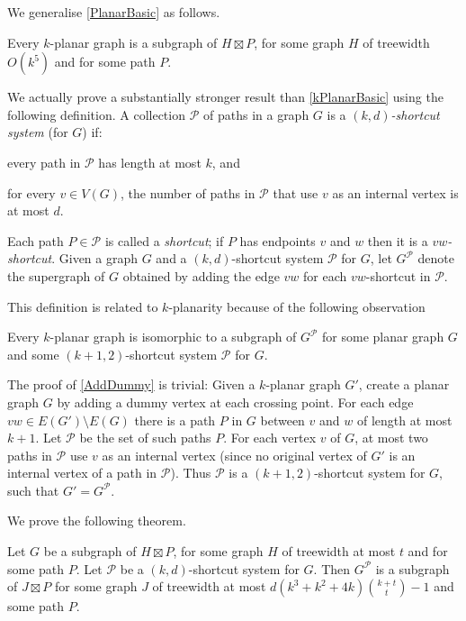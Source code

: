 \documentclass{patmorin}
\newcommand{\PP}{\mathcal{P}}
\begin{document}
We generalise \cref{PlanarBasic} as follows. 

\begin{thm}
\label{kPlanarBasic}
Every $k$-planar graph is a subgraph of $H\boxtimes P$, for some graph $H$ of treewidth $O(k^5)$ and for some path $P$. 
\end{thm}

We actually prove a substantially stronger result than \cref{kPlanarBasic} using the following definition. A collection $\mathcal{P}$ of paths in a graph $G$ is a \emph{$(k,d)$-shortcut system} (for $G$) if:
\begin{compactitem}
\item every path in $\mathcal{P}$ has length at most $k$, and
\item for every $v\in V(G)$, the number of paths in $\mathcal{P}$ that use $v$ as an internal vertex is at most $d$.
\end{compactitem} 
Each path $P\in\mathcal{P}$ is called a \emph{shortcut}; if $P$ has endpoints $v$ and $w$ then it is a \emph{$vw$-shortcut}. Given a graph $G$ and a $(k,d)$-shortcut system $\mathcal{P}$ for $G$, let $G^{\mathcal{P}}$ denote the supergraph of $G$ obtained by adding the edge $vw$ for each $vw$-shortcut in $\mathcal{P}$. 

This definition is related to $k$-planarity because of the following observation 

\begin{obs}
\label{AddDummy}
Every $k$-planar graph is isomorphic to a subgraph of $G^\PP$ for some planar graph $G$ and some $(k+1,2)$-shortcut system $\PP$ for $G$. 
\end{obs}

The proof of \cref{AddDummy} is trivial: Given a $k$-planar graph $G'$, create a planar graph $G$ by adding a dummy vertex at each crossing point. For each edge $vw\in E(G')\setminus E(G)$ there is a path $P$ in $G$ between $v$ and $w$ of length at most $k+1$. Let $\PP$ be the set of such paths $P$. For each vertex $v$ of $G$, at most two paths in $\PP$ use $v$ as an internal vertex (since no original vertex of $G'$ is an internal vertex of a path in $\PP$). Thus $\PP$ is a $(k+1,2)$-shortcut system for $G$, such that $G'=G^\PP$. 

We prove the following theorem.

\begin{thm}
\label{ShortcutProduct}
Let $G$ be a subgraph of $H\boxtimes P$, for some graph $H$ of treewidth at most $t$ and for some path $P$. 
Let $\PP$ be a $(k,d)$-shortcut system for $G$. Then $G^\PP$ is a subgraph of $J\boxtimes P$ for some graph $J$ of treewidth at most $d(k^3+k^2+4k)\binom{k+t}{t}-1$ and some path $P$. 
\end{thm}
\end{document}
